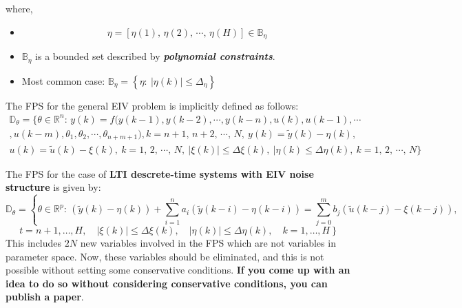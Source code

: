\begin{center}    %
\end{center}\vspace{1cm}
where,
\begin{itemize}
\item 
\[
\eta = \left[\eta(1),\,\eta(2),\, \cdots,\,\eta(H)\right] \in \mathbb{B}_\eta
\]
\item \(\mathbb{B}_\eta\) is a bounded set described by \textbf{\textit{polynomial constraints}}.
\item Most common case: \(\mathbb{B}_\eta = \left\{\eta: \: |\eta(k)| \leq \Delta_\eta \right\}\)
\end{itemize}

The FPS for the general EIV problem is implicitly defined as follows:
\[
\begin{array}{c}
\mathbb{D}_\theta = \{ \theta \in \mathbb{R}^n : \, y(k) = f( y(k-1), y(k-2), \cdots, y(k-n),  u(k), u(k-1), \cdots \\[1ex]
, u(k-m), \theta_1, \theta_2, \cdots, \theta_{n+m+1}),k = n+1,\,n+2,\,\cdots,\,N,\: y(k) = \tilde{y}(k) - \eta(k), \\[1ex]
u(k) = \tilde{u}(k) - \xi(k),\: k=1,\,2,\,\cdots,\,N,\: |\xi(k)|\leq \Delta\xi(k),\: |\eta(k)\leq \Delta\eta(k),\: k = 1,\,2,\,\cdots,\,N \}
\end{array}
\]

The FPS for the case of \textbf{LTI descrete-time systems with EIV noise structure} is given by:
\[
\mathbb{D}_\theta = \left\{ \theta \in \mathbb{R}^p : \, (\tilde{y}(k) - \eta(k)) + \sum_{i=1}^{n} a_i (\tilde{y}(k - i) - \eta(k - i)) = \sum_{j=0}^{m} b_j (\tilde{u}(k - j) - \xi(k - j)), \right.
\]
\[
\left. t = n + 1, \dots, H, \quad |\xi(k)| \leq \Delta\xi(k), \quad |\eta(k)| \leq \Delta\eta(k), \quad k = 1, \dots, H \right\}
\]
This includes \(2N\) new variables involved in the FPS which are not variables in parameter space. Now, these variables should be eliminated, and this is not possible without setting some conservative conditions. \textbf{If you come up with an idea to do so without considering conservative conditions, you can publish a paper}. 

